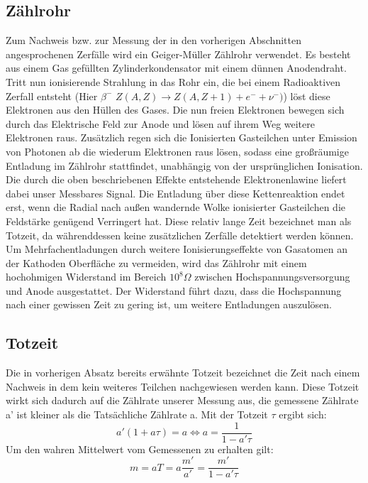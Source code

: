 \documentclass{article}
\begin{document}
            \subsection{Zählrohr}
                Zum Nachweis bzw. zur Messung der in den vorherigen Abschnitten angesprochenen Zerfälle wird ein Geiger-Müller Zählrohr
                verwendet. Es besteht aus einem Gas gefüllten Zylinderkondensator mit einem dünnen Anodendraht. Tritt nun ionisierende
                Strahlung in das Rohr ein, die bei einem Radioaktiven Zerfall entsteht (Hier $\beta^-$ $Z(A,Z) \rightarrow Z(A,Z+1) + e^- + \nu^-)$)
                löst diese Elektronen aus den Hüllen des Gases. Die nun freien Elektronen bewegen sich durch das Elektrische Feld zur Anode
                und lösen auf ihrem Weg weitere Elektronen raus. Zusätzlich regen sich die Ionisierten Gasteilchen unter Emission von Photonen ab
                die wiederum Elektronen raus lösen, sodass eine großräumige Entladung im Zählrohr stattfindet, unabhängig von der ursprünglichen Ionisation.
                Die durch die oben beschriebenen Effekte entstehende Elektronenlawine liefert dabei unser Messbares Signal.\newline
                Die Entladung über diese Kettenreaktion endet erst, wenn die Radial nach außen wandernde Wolke ionisierter Gasteilchen die 
                Feldstärke genügend Verringert hat. Diese relativ lange Zeit bezeichnet man als Totzeit, da währenddessen keine zusätzlichen
                Zerfälle detektiert werden können.
                Um Mehrfachentladungen durch weitere Ionisierungseffekte von Gasatomen an der Kathoden Oberfläche zu vermeiden, wird das Zählrohr
                mit einem hochohmigen Widerstand im Bereich $10^8 \Omega$ zwischen Hochspannungsversorgung und Anode ausgestattet. Der Widerstand
                führt dazu, dass die Hochspannung nach einer gewissen Zeit zu gering ist, um weitere Entladungen auszulösen.
            \subsection{Totzeit}
                Die in vorherigen Absatz bereits erwähnte Totzeit bezeichnet die Zeit nach einem Nachweis in dem kein weiteres Teilchen nachgewiesen
                werden kann. Diese Totzeit wirkt sich dadurch auf die Zählrate unserer Messung aus, die gemessene Zählrate a' ist kleiner als
                die Tatsächliche Zählrate a. Mit der Totzeit $\tau$ ergibt sich:
                $$ a' (1+ a\tau) = a \Leftrightarrow a = \frac{1}{1-a'\tau}$$
                Um den wahren Mittelwert vom Gemessenen zu erhalten gilt:
                $$ m = aT = a\frac{m'}{a'} = \frac{m'}{1-a'\tau}$$
\end{document}
